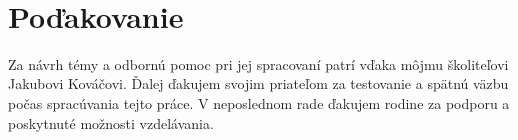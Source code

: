 ~\vfill
\section*{Poďakovanie}

Za návrh témy a odbornú pomoc pri jej spracovaní patrí vďaka môjmu školiteľovi Jakubovi Kováčovi. Ďalej ďakujem svojim priateľom za testovanie a spätnú väzbu počas spracúvania tejto práce. V neposlednom rade ďakujem rodine za podporu a poskytnuté možnosti vzdelávania.

\vspace{3cm}
